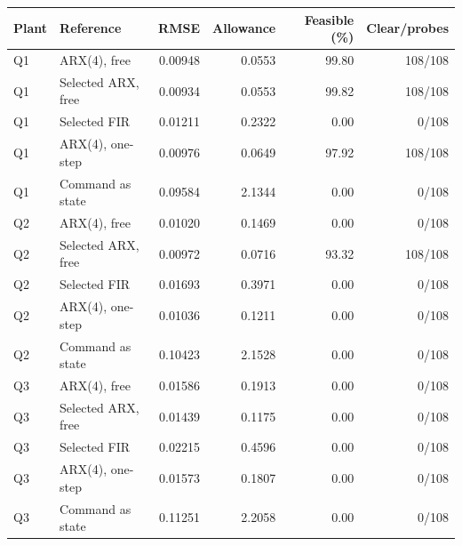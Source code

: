 \begin{tabular}{llrrrr}\toprule
Plant & Reference & RMSE & Allowance & Feasible (\%) & Clear/probes \\\midrule
Q1 & ARX(4), free & 0.00948 & 0.0553 & 99.80 & 108/108 \\
Q1 & Selected ARX, free & 0.00934 & 0.0553 & 99.82 & 108/108 \\
Q1 & Selected FIR & 0.01211 & 0.2322 & 0.00 & 0/108 \\
Q1 & ARX(4), one-step & 0.00976 & 0.0649 & 97.92 & 108/108 \\
Q1 & Command as state & 0.09584 & 2.1344 & 0.00 & 0/108 \\
Q2 & ARX(4), free & 0.01020 & 0.1469 & 0.00 & 0/108 \\
Q2 & Selected ARX, free & 0.00972 & 0.0716 & 93.32 & 108/108 \\
Q2 & Selected FIR & 0.01693 & 0.3971 & 0.00 & 0/108 \\
Q2 & ARX(4), one-step & 0.01036 & 0.1211 & 0.00 & 0/108 \\
Q2 & Command as state & 0.10423 & 2.1528 & 0.00 & 0/108 \\
Q3 & ARX(4), free & 0.01586 & 0.1913 & 0.00 & 0/108 \\
Q3 & Selected ARX, free & 0.01439 & 0.1175 & 0.00 & 0/108 \\
Q3 & Selected FIR & 0.02215 & 0.4596 & 0.00 & 0/108 \\
Q3 & ARX(4), one-step & 0.01573 & 0.1807 & 0.00 & 0/108 \\
Q3 & Command as state & 0.11251 & 2.2058 & 0.00 & 0/108 \\
\bottomrule\end{tabular}
